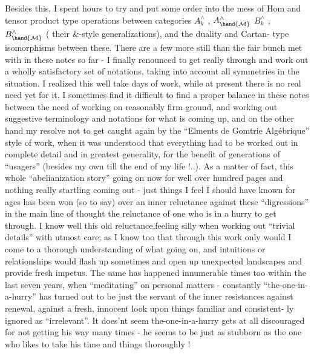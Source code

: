 
Besides this,  I spent hours to try and put some order into the mess
of  Hom and tensor product type operations between categories $A^{\wedge}_{k}$ , $A^{\wedge}_{\hand{\mathcal{M}}}$
$B^{\wedge}_{k}$ , $B^{\wedge}_{\hand{\mathcal{M}}}$ (  their \&-style generalizations), and the duality and Cartan-%
type isomorphisms between these.  There are a few more still than the
fair bunch met with in these notes so far  -  I finally renounced to get
really through and work out a wholly satisfactory set of notations,
taking into account all symmetries in the situation.  I realized this
  well take days of work,  while at present there is no real
need yet for it.  I sometimes find it difficult to find a proper balance
in these notes between the need of working on reasonably firm ground,
and  working out suggestive terminology and notations for
what is coming up,  and on the other hand my resolve not to get caught
 again by the ``Elments de Gomtrie Algébrique'' style of work,
when it was understood that everything had to be worked out in complete
detail and in greatest generality,  for the benefit of generations of
``usagers'' (besides my own till the end of my life !..).  As a matter of
fact,  this whole ``abelianization story''\hand{,} going on now for well over 
hundred pages and nothing really startling coming out  -  just things I
feel I should have known for ages\hand{,} \deleted{-} has been won (so to say) over an
inner reluctance against these ``digressions'' in the main line of thought\hand{,}
the reluctance of one who is in a hurry to get through.  I know well
this old reluctance,feeling silly when working out ``trivial details'' 
with utmost care;  as I know too that through this work only would I
come to a thorough understanding of what  going on,  and  
intuitions or relationships would flash up sometimes and open up
unexpected landscapes  and provide fresh impetus.  The same has happened
innumerable times too within the last seven years,  when ``meditating''
on personal matters  -  constantly ``the-one-in-a-hurry'' has turned out
to be just the servant of the inner resistances against renewal,
against a fresh, innocent look upon things \hand{\unsure{,}}familiar\hand{,} and  consistent-%
ly ignored as ``irrelevant''.  It does'nt seem the-one-in-a-hurry gets
at all discouraged for not getting his way many times  -  he seems to be
just as stubborn as the one who likes to take his time and   things
thoroughly !

